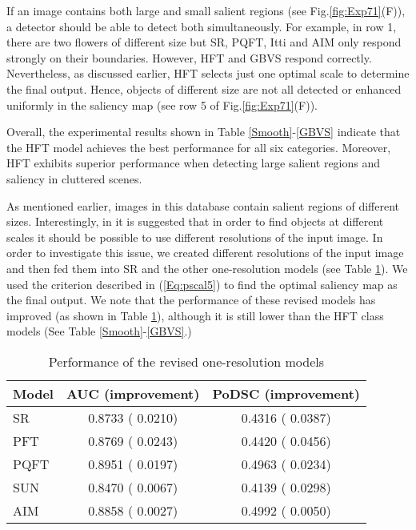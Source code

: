 \documentclass[10pt,journal,cspaper,compsoc]{IEEEtran}
\begin{document}
If an image contains both large and small salient regions (see Fig.\ref{fig:Exp71}(F)), a detector should be able to detect both simultaneously. For example, in row 1, there are two flowers of different size but SR, PQFT, Itti and AIM only respond strongly on their boundaries. However, HFT and GBVS respond correctly. Nevertheless, as discussed earlier, HFT selects just one optimal scale to determine the final output. Hence, objects of different size are not all detected or enhanced uniformly in the saliency map (see row 5 of Fig.\ref{fig:Exp71}(F)).

Overall, the experimental results shown in Table \ref{Smooth}-\ref{GBVS} indicate that the HFT model achieves the best performance for all six categories. Moreover, HFT exhibits superior performance when detecting large salient regions and saliency in cluttered scenes.

As mentioned earlier, images in this database contain salient regions of different sizes. Interestingly, in \cite{hou2007saliency} it is suggested that in order to find objects at different scales it should be possible to use different resolutions of the input image. In order to investigate this issue, we created different resolutions of the input image and then fed them into SR and the other one-resolution models (see Table \ref{one-scale}). We used the criterion described in (\ref{Eq:pscal5}) to find the optimal saliency map as the final output. We note that the performance of these revised models has improved (as shown in Table \ref{one-scale}), although it is still lower than the HFT class models (See Table \ref{Smooth}-\ref{GBVS}.)

\begin{table}
\renewcommand{\arraystretch}{1.3}
\caption{Performance of the revised one-resolution models}
\label{one-scale}
\centering
\begin{tabular}{lcc}
\toprule
Model  & \bfseries AUC (improvement) & \bfseries PoDSC (improvement)\\
\hline
SR   & 0.8733 ( 0.0210) & 0.4316 ( 0.0387)\\
PFT  & 0.8769 ( 0.0243) & 0.4420 ( 0.0456)\\
PQFT & 0.8951 ( 0.0197) & 0.4963 ( 0.0234)\\
SUN  & 0.8470 ( 0.0067) & 0.4139 ( 0.0298)\\
AIM  & 0.8858 ( 0.0027) & 0.4992 ( 0.0050)\\
\bottomrule
\end{tabular}
\end{table}
\end{document}
